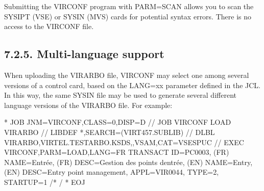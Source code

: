 \documentclass[letterpaper,10pt,english]{sphinxmanual}
\begin{document}

Submitting the VIRCONF program with PARM=SCAN allows you to scan the SYSIPT (VSE) or SYSIN (MVS) cards for potential syntax errors. There is no access to the VIRCONF file.


\subsection{7.2.5. Multi-language support}
\label{\detokenize{Installation_Guide:multi-language-support}}
When uploading the VIRARBO file, VIRCONF may select one among several versions of a control card, based on the LANG=xx parameter defined in the JCL. In this way, the same SYSIN file may be used to generate several different language versions of the VIRARBO file. For example:

\begin{sphinxVerbatim}[commandchars=\\\{\}]
* \PYGZdl{}\PYGZdl{} JOB JNM=VIRCONF,CLASS=0,DISP=D
// JOB VIRCONF LOAD VIRARBO
// LIBDEF *,SEARCH=(VIRT457.SUBLIB)
// DLBL VIRARBO,\PYGZsq{}VIRTEL.TESTARBO.KSDS\PYGZsq{},,VSAM,CAT=VSESPUC
// EXEC VIRCONF,PARM=\PYGZsq{}LOAD,LANG=FR\PYGZsq{}
        TRANSACT ID=PC\PYGZhy{}0003, \PYGZhy{}
        (FR) NAME=\PYGZsq{}Entrée\PYGZsq{}, \PYGZhy{}
        (FR) DESC=\PYGZdq{}Gestion des points d\PYGZsq{}entrée\PYGZdq{}, \PYGZhy{}
        (EN) NAME=\PYGZsq{}Entry\PYGZsq{}, \PYGZhy{}
        (EN) DESC=\PYGZsq{}Entry point management\PYGZsq{}, \PYGZhy{}
        APPL=VIR0044, \PYGZhy{}
        TYPE=2, \PYGZhy{}
        STARTUP=1
/*
/\PYGZam{}
* \PYGZdl{}\PYGZdl{} EOJ
\end{sphinxVerbatim}

\end{document}
